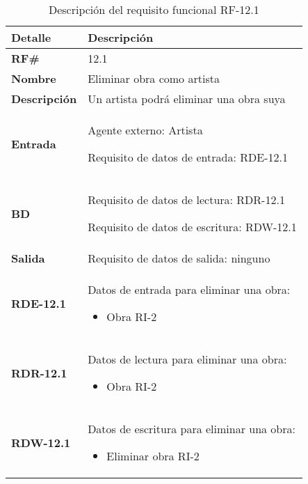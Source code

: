 \begin{table}[H]
    \centering
    \begin{tabular}{|p{3cm}|p{8cm}|}
        \hline
        \rowcolor{lightgray}
        \textbf{Detalle} & \textbf{Descripción} \\
        \hline
        \textbf{RF\#} & 12.1 \\
        \hline
        \textbf{Nombre} & Eliminar obra como artista \\
        \hline
        \textbf{Descripción} & Un artista podrá eliminar una obra suya \\
        \hline
        \textbf{Entrada} &
        Agente externo: Artista

        Requisito de datos de entrada: RDE-12.1 \\
        \hline
        \textbf{BD} &
        Requisito de datos de lectura: RDR-12.1

        Requisito de datos de escritura: RDW-12.1 \\
        \hline
        \textbf{Salida} & Requisito de datos de salida: ninguno \\
        \hline
        \textbf{RDE-12.1} & Datos de entrada para eliminar una obra:
            \begin{itemize}
                \item Obra RI-2
            \end{itemize} \\
        \hline
        \textbf{RDR-12.1} & Datos de lectura para eliminar una obra:
            \begin{itemize}
                \item Obra RI-2
            \end{itemize} \\
        \hline
        \textbf{RDW-12.1} & Datos de escritura para eliminar una obra:
            \begin{itemize}
                \item Eliminar obra RI-2
            \end{itemize} \\
        \hline
    \end{tabular}
    \caption{Descripción del requisito funcional RF-12.1}
    \label{tab:rf-12-1}
\end{table}

